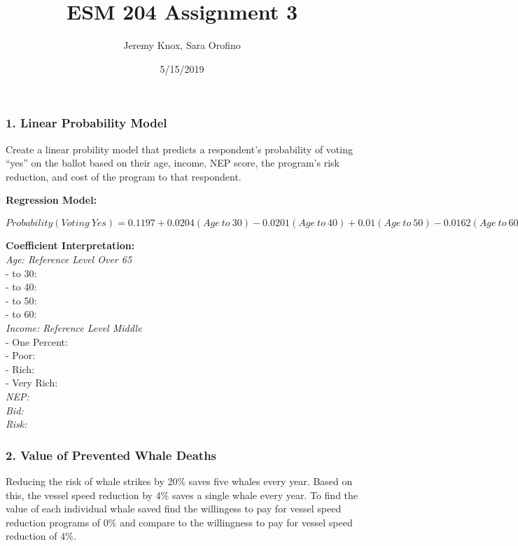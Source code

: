 \documentclass[]{article}
\title{ESM 204 Assignment 3}
\author{Jeremy Knox, Sara Orofino}
\date{5/15/2019}
\begin{document}
\maketitle

\subsubsection{1. Linear Probability
Model}\label{linear-probability-model}

Create a linear probility model that predicts a respondent's probability
of voting ``yes'' on the ballot based on their age, income, NEP score,
the program's risk reduction, and cost of the program to that
respondent.

\textbf{Regression Model:}

\(Probability(Voting~Yes) = 0.1197 + 0.0204(Age~to~30) - 0.0201(Age~to~40) + 0.01(Age~to~50) - 0.0162(Age~to~60) + 0.0088(Income~One~Percent) + 0.0027(Income~Poor) + 0.0075(Income~Rich) + 0.0468(Income~Very~Rich) + 0.0159(NEP) - 0.0011(Bid) + 7\times 10^{-4}(Risk~Reduction)\)

\textbf{Coefficient Interpretation:}\\
\emph{Age: Reference Level Over 65}\\
- to 30:\\
- to 40:\\
- to 50:\\
- to 60:\\
\emph{Income: Reference Level Middle}\\
- One Percent:\\
- Poor:\\
- Rich:\\
- Very Rich:\\
\emph{NEP:}\\
\emph{Bid:}\\
\emph{Risk:}

\subsubsection{2. Value of Prevented Whale
Deaths}\label{value-of-prevented-whale-deaths}

Reducing the risk of whale strikes by 20\% saves five whales every year.
Based on this, the vessel speed reduction by 4\% saves a single whale
every year. To find the value of each individual whale saved find the
willingess to pay for vessel speed reduction programs of 0\% and compare
to the willingness to pay for vessel speed reduction of 4\%.
\end{document}
